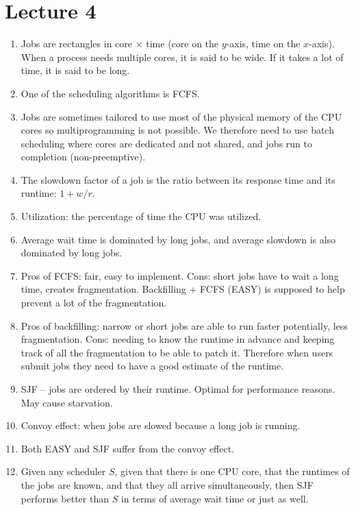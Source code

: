 \documentclass[12pt,a4paper]{article}
\begin{document}
\section{Lecture 4}

\begin{enumerate}
  \item Jobs are rectangles in core $\times$ time (core on the $y$-axis, time on the $x$-axis). When a process needs multiple cores, it is said to be wide. If it takes a lot of time, it is said to be long.
  \item One of the scheduling algorithms is FCFS.
  \item Jobs are sometimes tailored to use most of the physical memory of the CPU cores so multiprogramming is not possible. We therefore need to use batch scheduling where cores are dedicated and not shared, and jobs run to completion (non-preemptive).
  \item The slowdown factor of a job is the ratio between its response time and its runtime: $1 + w/r$.
  \item Utilization: the percentage of time the CPU was utilized.
  \item Average wait time is dominated by long jobs, and average slowdown is also dominated by long jobs.
  \item Pros of FCFS: fair, easy to implement. Cons: short jobs have to wait a long time, creates fragmentation. Backfilling + FCFS (EASY) is supposed to help prevent a lot of the fragmentation.
  \item Pros of backfilling: narrow or short jobs are able to run faster potentially, less fragmentation. Cons: needing to know the runtime in advance and keeping track of all the fragmentation to be able to patch it. Therefore when users submit jobs they need to have a good estimate of the runtime.
  \item SJF -- jobs are ordered by their runtime. Optimal for performance reasons. May cause starvation.
  \item Convoy effect: when jobs are slowed because a long job is running.
  \item Both EASY and SJF suffer from the convoy effect.
  \item Given any scheduler $S$, given that there is one CPU core, that the runtimes of the jobs are known, and that they all arrive simultaneously, then SJF performs better than $S$ in terms of average wait time or just as well.

\end{enumerate}
\end{document}
